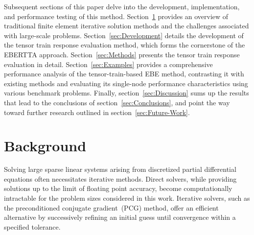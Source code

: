 \documentclass[]             %
{NASA}                       %
\begin{document}
Subsequent sections of this paper delve into the development, implementation, and performance testing of this method. 
Section~\ref{sec:Background} provides an overview of traditional finite element iterative solution methods and the challenges associated with large-scale problems. 
Section~\ref{sec:Development} details the development of the tensor train response evaluation method, which forms the cornerstone of the EBERTTA approach. 
Section~\ref{sec:Methods} presents the tensor train response evaluation in detail. 
Section~\ref{sec:Examples} provides a comprehensive performance analysis of the tensor-train-based EBE method,  contrasting it with existing methods and evaluating its single-node performance characteristics using various  benchmark problems. %
%
Finally, section~\ref{sec:Discussion} sums up the results that 
lead to the conclusions of section~\ref{sec:Conclusions}, and 
point the way toward further research outlined in section~\ref{sec:Future-Work}.

\section{Background}
\label{sec:Background}
%
%
Solving large sparse linear systems arising from discretized partial differential equations often necessitates iterative methods. Direct solvers, while providing solutions up to the limit of floating point accuracy, become computationally intractable for the problem sizes considered in this work. Iterative solvers, such as the preconditioned conjugate gradient~(PCG) method\cite{ref:barrett-1994}, offer an efficient alternative by successively refining an initial guess until convergence within a specified tolerance.
\end{document}
